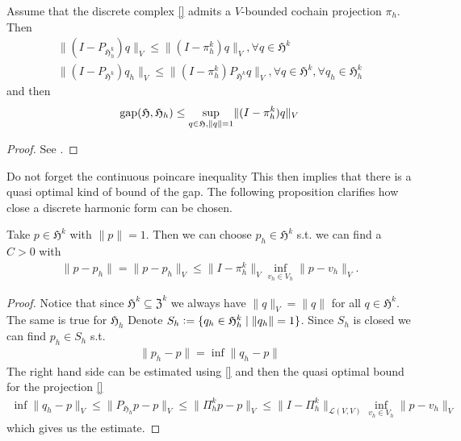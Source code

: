 \documentclass[../master_thesis.tex]{subfiles}
\begin{document}
\begin{proposition}
    Assume that the discrete complex \ref{} admits a $V$-bounded cochain projection
    $\pi_h$. Then
    \begin{align*}
        \lVert (I - P_{\mathfrak{H}^k_h}) q \rVert _V \leq \lVert (I - \pi_h^k) q \rVert _V, 
            \forall q \in \mathfrak{H}^k 
        \\ \lVert (I - P_{\mathfrak{H}^k}) q_h \rVert _V 
        \leq \lVert (I - \pi_h^k)P_{\mathfrak{H}^k} q \rVert _V, \forall q \in \mathfrak{H}^k, 
                \forall q_h \in \mathfrak{H}^k_h 
    \end{align*}
    and then 
    \begin{align*}
        \operatorname{gap} (\mathfrak{H}, \mathfrak{H}_h) 
        \leq \sup_{q \in \mathfrak{H}, \lVert q \rVert = 1} \lVert (I - \pi_h^k) q \rVert _V
    \end{align*}
\end{proposition}
\begin{proof}
    See \cite[Thm.\,5.2]{arnold}. 
\end{proof}
{\color{red} Do not forget the continuous poincare inequality} This then implies 
that there is a quasi optimal kind of bound of the gap. The following proposition 
clarifies how close a discrete harmonic form can be chosen.

\begin{proposition}
    Take $p \in \mathfrak{H}^k$ with $\lVert p \rVert = 1$. Then we can 
    choose $p_h \in \mathfrak{H}^k$ s.t. we can find a $C>0$ with 
    \begin{align*}
        \lVert p - p_h \rVert = \lVert p - p_h \rVert _V 
        \leq \lVert I - \pi_h^k\rVert _V \inf_{v_h \in V_h} \lVert p - v_h \rVert _V.
    \end{align*}
\end{proposition}
\begin{proof}
    Notice that since $\mathfrak{H}^k \subseteq \mathfrak{Z}^k$ we always have
    $\lVert q \rVert _V = \lVert q \rVert$ for all $q \in \mathfrak{H}^k$. The same is 
    true for $\mathfrak{H}_h$
    Denote $S_h \vcentcolon= \{ q_h \in \mathfrak{H}^k_h \mid \lVert q_h \rVert = 1 \}$.
    Since $S_h$ is closed we can find $p_h \in S_h$ s.t. 
    \begin{align*}
        \lVert p_h - p \rVert = \inf \lVert q_h - p \rVert
    \end{align*}
    The right hand side can be estimated using \ref{} and then the 
    quasi optimal bound for the projection \ref{}
    \begin{align*}
        \inf \lVert q_h - p \rVert _V \leq \lVert P_{\mathfrak{H}_h}p - p \rVert _V
        \leq \lVert \Pi_h^k p - p \rVert _V 
        \leq \lVert I - \Pi_h^k\rVert _{\mathcal{L}(V,V)}
            \inf_{v_h \in V_h} \lVert p - v_h \rVert _V
    \end{align*}
    which gives us the estimate.
\end{proof}
\end{document}
